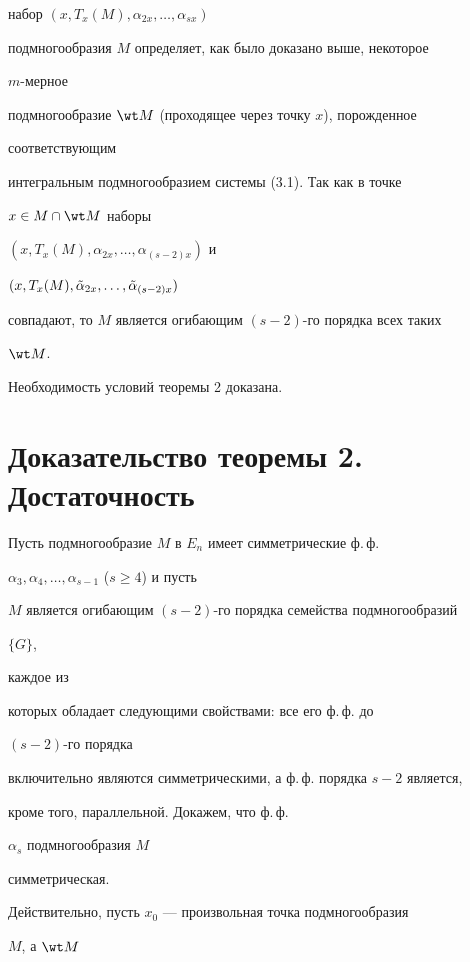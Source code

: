 набор $(x,T_x(M),\alpha_{2x},\dotsc,\alpha_{sx})$ 


подмногообразия $M$ определяет, как было доказано выше, некоторое 


$m$-мерное 


подмногообразие $\wt M$ (проходящее через точку $x$), порожденное 


соответствующим 


интегральным подмногообразием системы (3.1). Так как в точке 


$x\in M\cap\wt M$ наборы 


$(x,T_x(M),\alpha_{2x},\dotsc,\alpha_{(s-2)x})$ и 


$(x,T_x(M),\Tilde\alpha_{2x},\dotsc,\Tilde\alpha_{(s-2)x})$ 


совпадают, то $M$ является огибающим $(s-2)$-го порядка всех таких 


$\wt M$. 


Необходимость условий теоремы 2 доказана. 


 


\section{Доказательство теоремы 2. Достаточность} 


 


Пусть подмногообразие $M$ в $E_n$ имеет симметрические ф.\,ф. 


$\alpha_3,\alpha_4,\dotsc,\alpha_{s-1}$ ($s\ge 4$) и пусть 


$M$ является огибающим $(s-2)$-го порядка семейства подмногообразий 


$\{G\}$, 


каждое из 


которых обладает следующими свойствами: все его ф.\,ф. до 


$(s-2)$-го порядка 


включительно являются симметрическими, а ф.\,ф. порядка $s-2$ является, 


кроме того, параллельной. Докажем, что ф.\,ф. 


$\alpha_s$ подмногообразия $M$ 


симметрическая. 


 


Действительно, пусть $x_0$ --- произвольная точка подмногообразия 


$M$, а $\wt M$ 


